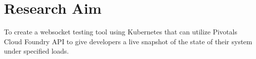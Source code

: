 \chapter{Research Aim}
To create a websocket testing tool using Kubernetes that can utilize Pivotals Cloud Foundry API to give developers a live snapshot of the state of their system under specified loads.